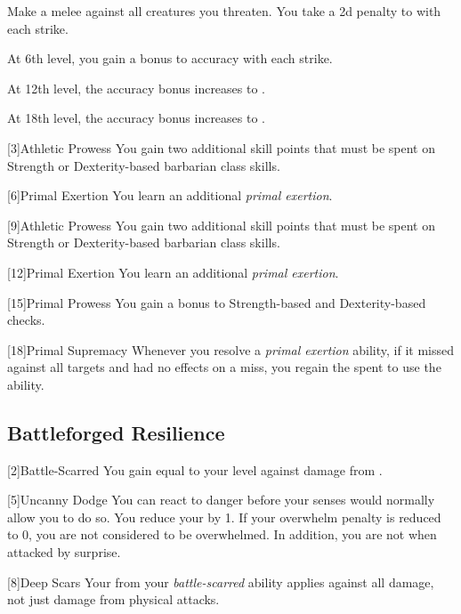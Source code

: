 {             Make a melee  against all creatures you threaten.
            You take a \minus2d penalty to  with each strike.
            \par At 6th level, you gain a  bonus to accuracy with each strike.
            \par At 12th level, the accuracy bonus increases to .
            \par At 18th level, the accuracy bonus increases to .
        }

        [3]{Athletic Prowess} You gain two additional skill points that must be spent on Strength or Dexterity-based barbarian class skills.

        [6]{Primal Exertion}
        You learn an additional \textit{primal exertion}.

        [9]{Athletic Prowess} You gain two additional skill points that must be spent on Strength or Dexterity-based barbarian class skills.

        [12]{Primal Exertion}
        You learn an additional \textit{primal exertion}.

        [15]{Primal Prowess}
        You gain a  bonus to Strength-based and Dexterity-based checks.

        [18]{Primal Supremacy}
        Whenever you resolve a \textit{primal exertion} ability, if it missed against all targets and had no effects on a miss, you regain the  spent to use the ability.

    \subsection{Battleforged Resilience}
        [2]{Battle-Scarred} You gain  equal to your level against damage from .

        [5]{Uncanny Dodge} You can react to danger before your senses would normally allow you to do so.
        You reduce your  by 1.
        If your overwhelm penalty is reduced to 0, you are not considered to be overwhelmed.
        In addition, you are not \unaware when attacked by surprise.

        [8]{Deep Scars} Your  from your \textit{battle-scarred} ability applies against all damage, not just damage from physical attacks.

